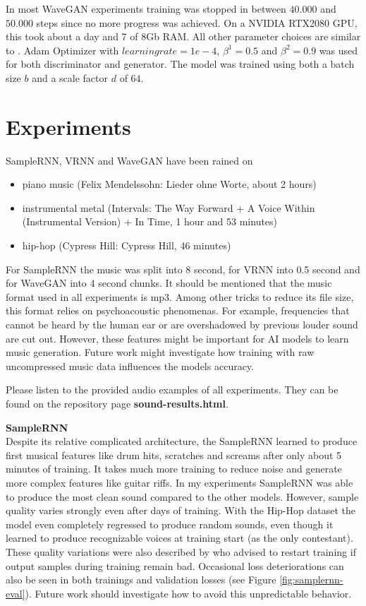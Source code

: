\documentclass[12pt]{article}
\begin{document}
In most WaveGAN experiments training was stopped in between $40.000$ and $50.000$ steps since no more progress was achieved.
On a NVIDIA RTX2080 GPU, this took about a day and 7 of 8Gb RAM.
All other parameter choices are similar to \cite{donahue2018adversarial}.
Adam Optimizer with $learning rate = 1e-4$, $\beta^1 = 0.5$ and $\beta^2 = 0.9$ was used for both discriminator and generator.
The model was trained using both a batch size $b$ and a scale factor $d$ of $64$.








\section{Experiments}
SampleRNN, VRNN and WaveGAN have been rained on
\begin{itemize}
 \item piano music (Felix Mendelssohn: Lieder ohne Worte, about 2 hours)
 \item instrumental metal (Intervals: The Way Forward + A Voice Within (Instrumental Version) + In Time, 1 hour and 53 minutes) 
 \item hip-hop (Cypress Hill: Cypress Hill, 46 minutes)
\end{itemize}

For SampleRNN the music was split into 8 second, for VRNN into 0.5 second and for WaveGAN into 4 second chunks.
It should be mentioned that the music format used in all experiments is mp3.
Among other tricks to reduce its file size, this format relies on psychoacoustic phenomenas.
For example, frequencies that cannot be heard by the human ear or are overshadowed by previous louder sound are cut out.
However, these features might be important for AI models to learn music generation.
Future work might investigate how training with raw uncompressed music data influences the models accuracy.


Please listen to the provided audio examples of all experiments.
They can be found on the repository page \textbf{sound-results.html}.





\textbf{SampleRNN}\\
Despite its relative complicated architecture, the SampleRNN learned to produce first musical features like drum hits, scratches and screams after only about 5 minutes of training.
It takes much more training to reduce noise and generate more complex features like guitar riffs.
In my experiments SampleRNN was able to produce the most clean sound compared to the other models.
However, sample quality varies strongly even after days of training.
With the Hip-Hop dataset the model even completely regressed to produce random sounds, even though it learned to produce recognizable voices at training start (as the only contestant).
These quality variations were also described by \cite{carr2018generating} who advised to restart training if output samples during training remain bad.
Occasional loss deteriorations can also be seen in both trainings and validation losses (see Figure \ref{fig:samplernn-eval}).
Future work should investigate how to avoid this unpredictable behavior.
\end{document}
